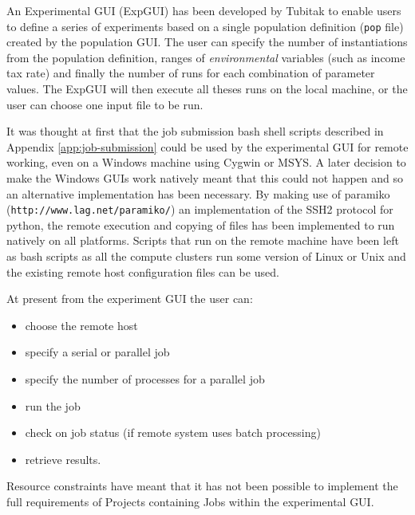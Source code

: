 
An Experimental GUI (ExpGUI) has been developed by Tubitak to enable users to define a series of experiments based on a single population definition (\texttt{pop} file) created by the population GUI. The user can specify the number of instantiations from the population definition, ranges of \textsl{environmental} variables (such as income tax rate) and finally the number of runs for each combination of parameter values. The ExpGUI will then execute all theses runs on the local machine, or the user can choose one input file to be run.

It was thought at first that the job submission bash shell scripts described in Appendix \ref{app:job-submission} could be used by the experimental GUI for remote working, even on a Windows machine using Cygwin or MSYS. A later decision to make the Windows GUIs work natively meant that this could not happen and so an alternative implementation has been necessary. By making use of paramiko (\verb+http://www.lag.net/paramiko/+) an implementation of the SSH2 protocol for python, the remote execution and copying of files has been implemented to run natively on all platforms.  Scripts that run on the remote machine have been left as bash scripts as all the compute clusters run some version of Linux or Unix and the existing remote host configuration files can be used. 

At present from the experiment GUI the user can:

\begin{itemize}
\item choose the remote host
\item specify a serial or parallel job
\item specify the number of processes for a parallel job
\item run the job
\item check on job status (if remote system uses batch processing)
\item retrieve results.
\end{itemize}

Resource constraints have meant that it has not been possible to implement the full requirements of Projects containing Jobs within the experimental GUI.

